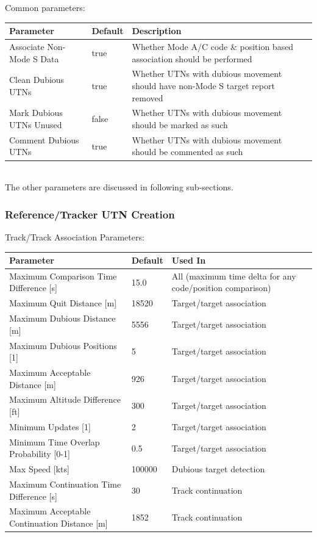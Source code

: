 Common parameters:
\begin{table}[H]
  \center
  \begin{tabularx}{\textwidth}{ | l | l | X |}
    \hline
    \textbf{Parameter} & \textbf{Default} &  \textbf{Description} \\ \hline
    Associate Non-Mode S Data & true & Whether Mode A/C code \& position based association should be performed \\ \hline
    Clean Dubious UTNs & true & Whether UTNs with dubious movement should have non-Mode S target report removed \\ \hline
    Mark Dubious UTNs Unused & false & Whether UTNs with dubious movement should be marked as such \\ \hline
    Comment Dubious UTNs & true & Whether UTNs with dubious movement should be commented as such \\ \hline
  \end{tabularx}
\end{table}
\ \\

The other parameters are discussed in following sub-sections.

\subsubsection{Reference/Tracker UTN Creation}

Track/Track Association Parameters:
\begin{table}[H]
  \center
  \begin{tabularx}{\textwidth}{ | X | l | X |}
    \hline
    \textbf{Parameter} & \textbf{Default} &  \textbf{Used In} \\ \hline
    Maximum Comparison Time Difference [s] & 15.0 & All (maximum time delta for any code/position comparison) \\ \hline
    Maximum Quit Distance [m] & 18520 & Target/target association \\ \hline
    Maximum Dubious Distance [m] & 5556 & Target/target association \\ \hline
    Maximum Dubious Positions [1] & 5 & Target/target association \\ \hline
    Maximum Acceptable Distance [m] & 926 & Target/target association \\ \hline
    Maximum Altitude Difference [ft] & 300 & Target/target association \\ \hline
    Minimum Updates [1] & 2 & Target/target association \\ \hline
    Minimum Time Overlap Probability [0-1] & 0.5 & Target/target association \\ \hline
    Max Speed [kts] & 100000 & Dubious target detection \\ \hline
    Maximum Continuation Time Difference [s] & 30 & Track continuation \\ \hline
    Maximum Acceptable Continuation Distance [m] & 1852 & Track continuation \\ \hline
  \end{tabularx}
\end{table}
\ \\

